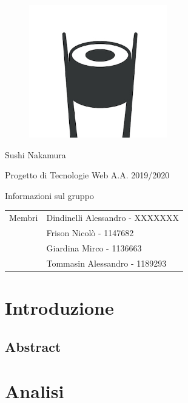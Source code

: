 \documentclass{article}
\begin{document}
	\begin{titlepage}
		\begin{figure}[http]
			\centering
			\includegraphics[width=6cm]{logo.jpg}
		\end{figure}
	
		\vspace*{2cm}
		
		{\huge\bfseries\centerline{Sushi Nakamura} }
		\centerline{Progetto di Tecnologie Web A.A. 2019/2020}
		
		\vspace*{1cm}
		{\bfseries \centerline{Informazioni sul gruppo}}
		\begin{center}
			\begin{tabular}{ c|l } 
				Membri & Dindinelli Alessandro - XXXXXXX\\ 
				& Frison Nicolò - 1147682\\ 
				& Giardina Mirco - 1136663\\
				& Tommasin Alessandro - 1189293\\ 
			\end{tabular}
		\end{center}
		
		\vspace*{\fill}
		
	\end{titlepage}
	
	\clearpage
	\renewcommand*\contentsname{Indice}
	\tableofcontents	
	\newpage
	
	\section{Introduzione}
		\subsection{Abstract}

	
	\section{Analisi}
\end{document}

